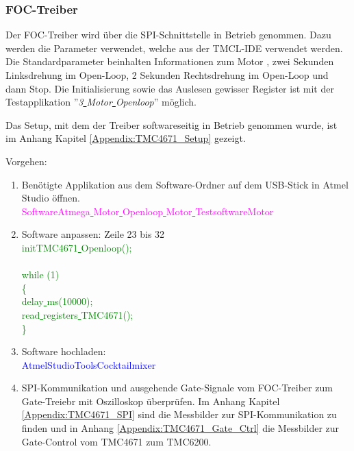 \subsubsection{FOC-Treiber}
\label{subsubsec:Inbetriebnahme_FOC_Treiber}

Der FOC-Treiber wird über die SPI-Schnittstelle in Betrieb genommen. Dazu werden die Parameter verwendet, welche aus der TMCL-IDE verwendet werden. Die Standardparameter beinhalten Informationen zum Motor , zwei Sekunden Linksdrehung im Open-Loop, 2 Sekunden Rechtsdrehung im Open-Loop und dann Stop. Die Initialisierung sowie das Auslesen gewisser Register ist mit der Testapplikation ''\textit{3\underline{ }Motor\underline{ }Openloop}'' möglich.

Das Setup, mit dem der Treiber softwareseitig in Betrieb genommen wurde, ist im Anhang Kapitel \ref{Appendix:TMC4671_Setup} gezeigt.

Vorgehen:
\begin{enumerate}
\item Benötigte Applikation aus dem Software-Ordner auf dem USB-Stick in Atmel Studio öffnen.\\
\textcolor{magenta}{Software\textrightarrow Atmega\underline{ }Motor\underline{ }Openloop\underline{ }Motor\underline{ }Testsoftware\textrightarrow Motor}\\

\item Software anpassen: Zeile 23 bis 32\\
\textcolor{green}{
	initTMC4671\underline{ }Openloop();\\
\\
    while (1) \\
    \{\\
		\underline{ }delay\underline{ }ms(10000);\\
		read\underline{ }registers\underline{ }TMC4671();\\
    \}
}\\


\item Software hochladen:\\
\textcolor{blue}{AtmelStudio\textrightarrow Tools\textrightarrow Cocktailmixer}\\

\item SPI-Kommunikation und ausgehende Gate-Signale vom FOC-Treiber zum Gate-Treiebr mit Oszilloskop überprüfen. Im Anhang Kapitel \ref{Appendix:TMC4671_SPI} sind die Messbilder zur SPI-Kommunikation zu finden und in Anhang \ref{Appendix:TMC4671_Gate_Ctrl} die Messbilder zur Gate-Control vom TMC4671 zum TMC6200.
\end{enumerate}